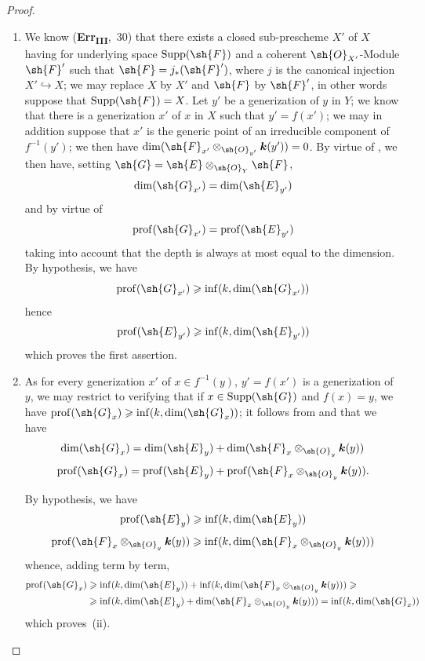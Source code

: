 \begin{proof}
\medskip\noindent
\begin{enumerate}[label=(\roman*)]
  \item We know (\textbf{Err}\textsubscript{\textbf{III}},~30) that there exists a closed sub-prescheme $X'$ of $X$ having for underlying space $\operatorname{Supp}(\sh{F})$ and a coherent $\sh{O}_{X'}$-Module $\sh{F}'$ such that $\sh{F}=j_*(\sh{F}')$, where $j$ is the canonical injection $X'\hookrightarrow X$; we may replace $X$ by $X'$ and $\sh{F}$ by $\sh{F}'$, in other words suppose that $\operatorname{Supp}(\sh{F})=X$.
Let $y'$ be a generization of $y$ in $Y$; we know  that there is a generization $x'$ of $x$ in $X$ such that $y'=f(x')$; we may in addition suppose that $x'$ is the generic point of an irreducible component of $f^{-1}(y')$; we then have $\dim(\sh{F}_{x'}\otimes_{\sh{O}_{y'}}\boldsymbol{k}(y'))=0$.
By virtue of , we then have, setting $\sh{G}=\sh{E}\otimes_{\sh{O}_Y}\sh{F}$,
\[
  \dim(\sh{G}_{x'})=\dim(\sh{E}_{y'})
\]
and by virtue of 
\[
  \operatorname{prof}(\sh{G}_{x'})=\operatorname{prof}(\sh{E}_{y'})
\]
taking into account that the depth is always at most equal to the dimension.
By hypothesis, we have
\[
  \operatorname{prof}(\sh{G}_{x'})\geqslant\inf(k,\dim(\sh{G}_{x'}))
\]
hence
\[
  \operatorname{prof}(\sh{E}_{y'})\geqslant\inf(k,\dim(\sh{E}_{y'}))
\]
which proves the first assertion.

  \item As for every generization $x'$ of $x\in f^{-1}(y)$, $y'=f(x')$ is a generization of $y$, we may restrict to verifying that if $x\in\operatorname{Supp}(\sh{G})$ and $f(x)=y$, we have $\operatorname{prof}(\sh{G}_x)\geqslant\inf(k,\dim(\sh{G}_x))$; it follows from  and  that we have
\[
  \dim(\sh{G}_x)=\dim(\sh{E}_y)+\dim(\sh{F}_x\otimes_{\sh{O}_y}\boldsymbol{k}(y))
\]
\[
  \operatorname{prof}(\sh{G}_x)=\operatorname{prof}(\sh{E}_y)+\operatorname{prof}(\sh{F}_x\otimes_{\sh{O}_y}\boldsymbol{k}(y)).
\]

By hypothesis, we have
\[
  \operatorname{prof}(\sh{E}_y)\geqslant\inf(k,\dim(\sh{E}_y))
\]
\[
  \operatorname{prof}(\sh{F}_x\otimes_{\sh{O}_y}\boldsymbol{k}(y))\geqslant\inf(k,\dim(\sh{F}_x\otimes_{\sh{O}_y}\boldsymbol{k}(y)))
\]
whence, adding term by term,
\begin{align*}
  \operatorname{prof}(\sh{G}_x)&\geqslant\inf(k,\dim(\sh{E}_y))+\inf(k,\dim(\sh{F}_x\otimes_{\sh{O}_y}\boldsymbol{k}(y)))\geqslant{}\\
  &\geqslant\inf(k,\dim(\sh{E}_y)+\dim(\sh{F}_x\otimes_{\sh{O}_y}\boldsymbol{k}(y)))=\inf(k,\dim(\sh{G}_x))
\end{align*}
which proves~(ii).
\end{enumerate}
\end{proof}

